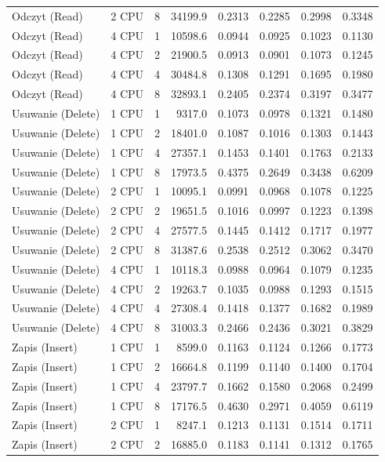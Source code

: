 \begin{table}[ht]
{\begin{tabular}{llcrrrrr}
Odczyt (Read) & 2 CPU & 8 & 34199.9 & 0.2313 & 0.2285 & 0.2998 & 0.3348 \\
Odczyt (Read) & 4 CPU & 1 & 10598.6 & 0.0944 & 0.0925 & 0.1023 & 0.1130 \\
Odczyt (Read) & 4 CPU & 2 & 21900.5 & 0.0913 & 0.0901 & 0.1073 & 0.1245 \\
Odczyt (Read) & 4 CPU & 4 & 30484.8 & 0.1308 & 0.1291 & 0.1695 & 0.1980 \\
Odczyt (Read) & 4 CPU & 8 & 32893.1 & 0.2405 & 0.2374 & 0.3197 & 0.3477 \\
Usuwanie (Delete) & 1 CPU & 1 & 9317.0 & 0.1073 & 0.0978 & 0.1321 & 0.1480 \\
Usuwanie (Delete) & 1 CPU & 2 & 18401.0 & 0.1087 & 0.1016 & 0.1303 & 0.1443 \\
Usuwanie (Delete) & 1 CPU & 4 & 27357.1 & 0.1453 & 0.1401 & 0.1763 & 0.2133 \\
Usuwanie (Delete) & 1 CPU & 8 & 17973.5 & 0.4375 & 0.2649 & 0.3438 & 0.6209 \\
Usuwanie (Delete) & 2 CPU & 1 & 10095.1 & 0.0991 & 0.0968 & 0.1078 & 0.1225 \\
Usuwanie (Delete) & 2 CPU & 2 & 19651.5 & 0.1016 & 0.0997 & 0.1223 & 0.1398 \\
Usuwanie (Delete) & 2 CPU & 4 & 27577.5 & 0.1445 & 0.1412 & 0.1717 & 0.1977 \\
Usuwanie (Delete) & 2 CPU & 8 & 31387.6 & 0.2538 & 0.2512 & 0.3062 & 0.3470 \\
Usuwanie (Delete) & 4 CPU & 1 & 10118.3 & 0.0988 & 0.0964 & 0.1079 & 0.1235 \\
Usuwanie (Delete) & 4 CPU & 2 & 19263.7 & 0.1035 & 0.0988 & 0.1293 & 0.1515 \\
Usuwanie (Delete) & 4 CPU & 4 & 27308.4 & 0.1418 & 0.1377 & 0.1682 & 0.1989 \\
Usuwanie (Delete) & 4 CPU & 8 & 31003.3 & 0.2466 & 0.2436 & 0.3021 & 0.3829 \\
Zapis (Insert) & 1 CPU & 1 & 8599.0 & 0.1163 & 0.1124 & 0.1266 & 0.1773 \\
Zapis (Insert) & 1 CPU & 2 & 16664.8 & 0.1199 & 0.1140 & 0.1400 & 0.1704 \\
Zapis (Insert) & 1 CPU & 4 & 23797.7 & 0.1662 & 0.1580 & 0.2068 & 0.2499 \\
Zapis (Insert) & 1 CPU & 8 & 17176.5 & 0.4630 & 0.2971 & 0.4059 & 0.6119 \\
Zapis (Insert) & 2 CPU & 1 & 8247.1 & 0.1213 & 0.1131 & 0.1514 & 0.1711 \\
Zapis (Insert) & 2 CPU & 2 & 16885.0 & 0.1183 & 0.1141 & 0.1312 & 0.1765 \\

\end{tabular}}
\end{table}
